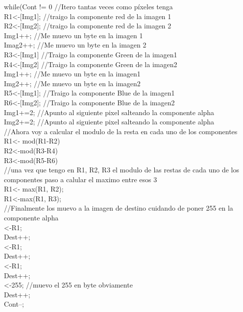 while(Cont != 0{  		//Itero tantas veces como píxeles tenga\\
	R1<-[Img1];  		//traigo la componente red de la imagen 1\\
	R2<-[Img2]; 	 	//traigo la componente red de la imagen 2\\
	Img1++; 	 	//Me muevo un byte en la imagen 1\\
	Imag2++; 		//Me muevo un byte en la imagen 2\\
	R3<-[Img1] 		//Traigo la componente Green de la imagen1\\
	R4<-[Img2] 		//Traigo la componente Green de la imagen2\\
	Img1++; 		//Me muevo un byte en la imagen1\\
	Img2++;        		//Me muevo un byte en la imagen2\\
	R5<-[Img1]; 		//Traigo la componente Blue de la imagen1\\
	R6<-[Img2]; 		//Traigo la componente Blue de la imagen2\\
	Img1+=2;		//Apunto al siguiente pixel salteando la componente alpha\\
	Img2+=2; 		//Apunto al siguiente pixel salteando la componente alpha\\
	//Ahora voy a calcular el modulo de la resta en cada uno de los componentes\\
	R1<- mod(R1-R2)\\
	R2<-mod(R3-R4)\\
	R3<-mod(R5-R6)\\
	//una vez que tengo  en R1, R2, R3 el modulo de las restas de cada uno de los componentes paso a calular el maximo entre esos 3\\
	R1<- max(R1, R2); \\
	R1<-max(R1, R3);\\
	//Finalmente los muevo a la imagen de destino cuidando de poner 255 en la componente alpha\\
	[Dest]<-R1;\\
	Dest++;\\
	[Dest]<-R1;\\
	Dest++;\\
	[Dest]<-R1;\\
	Dest++;\\
	[Dest]<-255; 		//muevo el 255 en byte obviamente\\
	Dest++;\\
	Cont--;\\

}\\ \\
